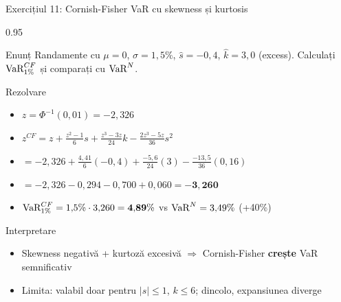 \documentclass[9pt, aspectratio=169, t]{beamer}
\begin{document}
\begin{frame}[shrink=10]{Exercițiul 11: Cornish-Fisher VaR cu skewness și kurtosis}
    \begin{cminipage}{0.95\textwidth}
    \begin{block}{Enunț}
    Randamente cu $\mu = 0$, $\sigma = 1{,}5\%$, $\hat{s} = -0{,}4$, $\hat{k} = 3{,}0$ (excess). Calculați $\text{VaR}^{CF}_{1\%}$ și comparați cu $\text{VaR}^N$.
    \end{block}
    \begin{exampleblock}{Rezolvare}
    \begin{itemize}\setlength{\itemsep}{0pt}
        \item $z = \Phi^{-1}(0{,}01) = -2{,}326$
        \item $z^{CF} = z + \frac{z^2-1}{6}s + \frac{z^3-3z}{24}k - \frac{2z^3-5z}{36}s^2$
        \item $= -2{,}326 + \frac{4{,}41}{6}(-0{,}4) + \frac{-5{,}6}{24}(3) - \frac{-13{,}5}{36}(0{,}16)$
        \item $= -2{,}326 - 0{,}294 - 0{,}700 + 0{,}060 = \mathbf{-3{,}260}$
        \item $\text{VaR}^{CF}_{1\%} = 1{,}5\% \cdot 3{,}260 = \mathbf{4{,}89\%}$ vs $\text{VaR}^N = 3{,}49\%$ (+40\%)
    \end{itemize}
    \end{exampleblock}
    \begin{alertblock}{Interpretare}
    \begin{itemize}\setlength{\itemsep}{0pt}
        \item Skewness negativă + kurtoză excesivă $\Rightarrow$ Cornish-Fisher \textbf{crește} VaR semnificativ
        \item Limita: valabil doar pentru $|s| \leq 1$, $k \leq 6$; dincolo, expansiunea diverge
    \end{itemize}
    \end{alertblock}
    \end{cminipage}
\end{frame}
\end{document}
